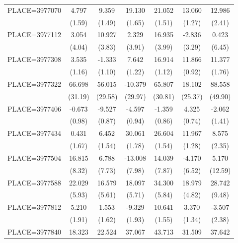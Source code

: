 {\begin{tabular}{l*{6}{c}}
PLACE=3977070       &       4.797&       9.359&      19.130&      21.052&      13.060&      12.986\\
                    &      (1.59)&      (1.49)&      (1.65)&      (1.51)&      (1.27)&      (2.41)\\
PLACE=3977112       &       3.054&      10.927&       2.329&      16.935&      -2.836&       0.423\\
                    &      (4.04)&      (3.83)&      (3.91)&      (3.99)&      (3.29)&      (6.45)\\
PLACE=3977308       &       3.535&      -1.333&       7.642&      16.914&      11.866&      11.377\\
                    &      (1.16)&      (1.10)&      (1.22)&      (1.12)&      (0.92)&      (1.76)\\
PLACE=3977322       &      66.698&      56.015&     -10.379&      65.807&      18.102&      88.558\\
                    &     (31.19)&     (29.58)&     (29.97)&     (30.81)&     (25.37)&     (49.90)\\
PLACE=3977406       &      -0.673&      -9.527&      -4.597&      -1.359&       4.325&      -2.062\\
                    &      (0.98)&      (0.87)&      (0.94)&      (0.86)&      (0.74)&      (1.41)\\
PLACE=3977434       &       0.431&       6.452&      30.061&      26.604&      11.967&       8.575\\
                    &      (1.67)&      (1.54)&      (1.78)&      (1.54)&      (1.28)&      (2.35)\\
PLACE=3977504       &      16.815&       6.788&     -13.008&      14.039&      -4.170&       5.170\\
                    &      (8.32)&      (7.73)&      (7.98)&      (7.87)&      (6.52)&     (12.59)\\
PLACE=3977588       &      22.029&      16.579&      18.097&      34.300&      18.979&      28.742\\
                    &      (5.93)&      (5.61)&      (5.71)&      (5.84)&      (4.82)&      (9.48)\\
PLACE=3977812       &       5.210&       1.553&      -9.329&      10.641&       3.370&      -3.507\\
                    &      (1.91)&      (1.62)&      (1.93)&      (1.55)&      (1.34)&      (2.38)\\
PLACE=3977840       &      18.323&      22.524&      37.067&      43.713&      31.509&      37.642\\

\end{tabular}}
